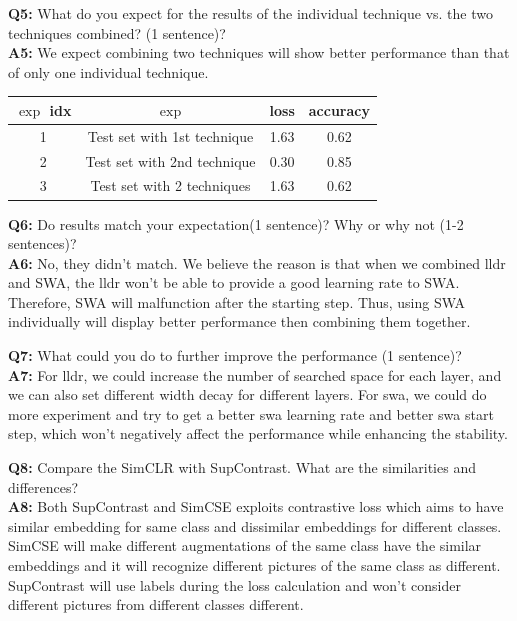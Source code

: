 \documentclass{article}
\begin{document}
    \textbf{Q5:} What do you expect for the results of the individual technique vs. the two techniques combined? (1 sentence)?\\
    \textbf{A5:} We expect combining two techniques will show better performance than that of only one individual technique.

    \begin{tabular}{|c|c|c|c|}
        \hline $\exp$ idx & $\exp$                      & loss & accuracy \\
        \hline 1          & Test set with 1st technique &  1.63    &    0.62     \\
        2                 & Test set with 2nd technique &  0.30    &    0.85     \\
        3                 & Test set with 2 techniques  &  1.63    &    0.62     \\
        \hline
    \end{tabular}

    \textbf{Q6:} Do results match your expectation(1 sentence)? Why or why not (1-2 sentences)?\\
    \textbf{A6:} No, they didn't match. We believe the reason is that when we combined lldr and SWA, the lldr won't be able to provide a good learning rate to SWA. Therefore, SWA will malfunction after the starting step.
    Thus, using SWA individually will display better performance then combining them together.

    \textbf{Q7:} What could you do to further improve the performance (1 sentence)?\\
    \textbf{A7:} For lldr, we could increase the number of searched space for each layer, and we can also set different width decay for different layers.
    For swa, we could do more experiment and try to get a better swa learning rate and better swa start step, which won't negatively affect the performance while enhancing the stability.

    \textbf{Q8:} Compare the SimCLR with SupContrast. What are the similarities and differences?\\
    \textbf{A8:} Both SupContrast and SimCSE  exploits contrastive loss which aims to have similar embedding for same class and dissimilar embeddings for different classes.
    SimCSE will make different augmentations of the same class have the similar embeddings and it will recognize different pictures of the same class as different. SupContrast will use labels during the loss calculation and won't consider different pictures from different classes different.
\end{document}
